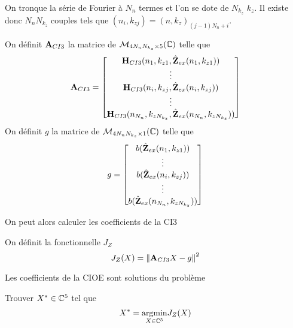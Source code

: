     On tronque la série de Fourier à \(N_{n}\) termes et l’on se dote de \(N_{k_z}\) \(k_z\). Il existe donc \(N_{n}N_{k_z}\) couples tels que \((n_i,k_{zj}) = (n,k_z)_{(j-1)N_{n}+i}\).
    \begin{defn}
      On définit \(\mathbf{A}_{CI3}\) la matrice de \(\mathcal{M}_{4N_{n}N_{k_z}\times5}(\mathbb C)\) telle que
      \begin{equation*}
        \mathbf{A}_{CI3} = 
        \begin{bmatrix}
          \mathbf{H}_{CI3}(n_1,k_{z1},\hat{\mathbf{Z}}_{ex}(n_1,k_{z1}))
          \\
          \vdots
          \\
          \mathbf{H}_{CI3}(n_i,k_{zj},\hat{\mathbf{Z}}_{ex}(n_i,k_{zj}))
          \\
          \vdots
          \\
          \mathbf{H}_{CI3}(n_{N_n},k_{zN_{k_z}},\hat{\mathbf{Z}}_{ex}(n_{N_n},k_{zN_{k_z}}))
        \end{bmatrix}
      \end{equation*}
      On définit \(g\) la matrice de \(\mathcal{M}_{4N_{n}N_{k_z}\times1}(\mathbb C)\) telle que
      \begin{equation*}
        g = 
        \begin{bmatrix}
          b(\hat{\mathbf{Z}}_{ex}(n_1,k_{z1}))
          \\
          \vdots
          \\
          b(\hat{\mathbf{Z}}_{ex}(n_i,k_{zj}))
          \\
          \vdots
          \\
          b(\hat{\mathbf{Z}}_{ex}(n_{N_n},k_{zN_{k_z}}))
        \end{bmatrix}
      \end{equation*}
    \end{defn}

    On peut alors calculer les coefficients de la CI3
    \begin{defn}
      On définit la fonctionnelle \(J_Z\)
      \begin{equation*}
        J_Z(X) = \left\lVert{\mathbf{A}}_{CI3}X - {g}\right\rVert^2
      \end{equation*}
    \end{defn}
    \begin{thm}

      Les coefficients de la CIOE sont solutions du problème

      Trouver \(X^* \in \mathbb C^5\) tel que
      \begin{equation*}
        X^* = {\underset{X\in \mathbb C^5}{\operatorname{argmin}}}  J_Z(X)
      \end{equation*}
    \end{thm}

